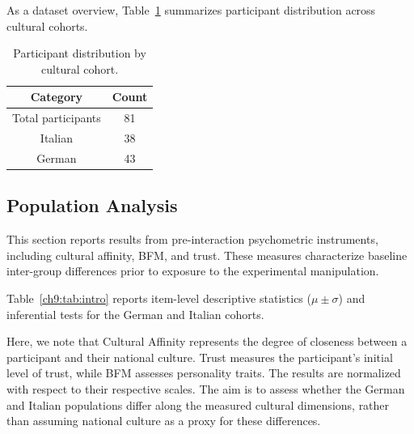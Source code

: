 As a dataset overview, Table~\ref{ch9:tab:metadata} summarizes participant distribution across cultural cohorts.

\begin{table}[]
    \centering
    \begin{tabular}{|c|c|}
    \hline
       \textbf{Category}  & \textbf{Count} \\
       \hline
        Total participants & 81 \\
        Italian & 38 \\
        German & 43 \\
        \hline
    \end{tabular}
    \caption{Participant distribution by cultural cohort.}
    \label{ch9:tab:metadata}
\end{table}

\subsection{Population Analysis}

This section reports results from pre-interaction psychometric instruments, including cultural affinity, BFM, and trust. These measures characterize baseline inter-group differences prior to exposure to the experimental manipulation.

Table~\ref{ch9:tab:intro} reports item-level descriptive statistics ($\mu \pm \sigma$) and inferential tests for the German and Italian cohorts. %

Here, we note that Cultural Affinity represents the degree of closeness between a participant and their national culture. Trust measures the participant’s initial level of trust, while BFM assesses personality traits. The results are normalized with respect to their respective scales. The aim is to assess whether the German and Italian populations differ along the measured cultural dimensions, rather than assuming national culture as a proxy for these differences.

